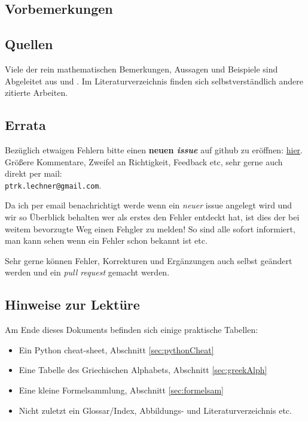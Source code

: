 \begin{multicols}{2}

\chapter*{Vorbemerkungen}

\section*{Quellen}

Viele der rein mathematischen Bemerkungen, Aussagen und Beispiele sind Abgeleitet aus \cite{merziger2024repetitorium} und \cite{gollmann2017mathematik}. Im Literaturverzeichnis finden sich selbstverständlich andere zitierte Arbeiten.

\section*{Errata}

Bezüglich etwaigen Fehlern bitte einen \textbf{neuen \emph{issue}} auf github zu eröffnen: \href{https://github.com/hrtlacek/matheFuerTonmeisterinnen/issues}{hier}. Größere Kommentare, Zweifel an Richtigkeit, Feedback etc, sehr gerne auch direkt per mail: \\
\texttt{ptrk.lechner@gmail.com}.

Da ich per email benachrichtigt werde wenn ein \emph{neuer} issue angelegt wird und wir so Überblick behalten wer als erstes den Fehler entdeckt hat, ist dies der bei weitem bevorzugte Weg einen Fehgler zu melden! So sind alle sofort informiert, man kann sehen wenn ein Fehler schon bekannt ist etc.

Sehr gerne können Fehler, Korrekturen und Ergänzungen auch selbst geändert werden und ein \emph{pull request} gemacht werden.

\section*{Hinweise zur Lektüre}

Am Ende dieses Dokuments befinden sich einige praktische Tabellen:
\begin{itemize}
\item Ein Python cheat-sheet, Abschnitt \ref{sec:pythonCheat}
\item Eine Tabelle des Griechischen Alphabets, Abschnitt \ref{sec:greekAlph}
\item Eine kleine Formelsammlung, Abschnitt \ref{sec:formelsam}
\item Nicht zuletzt ein Glossar/Index, Abbildungs- und Literaturverzeichnis etc.
\end{itemize} 


\end{multicols}
